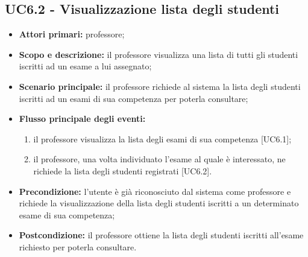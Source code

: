 \documentclass[AnalisiDeiRequisiti.tex]{subfiles}
\begin{document}
\subsection{UC6.2 - Visualizzazione lista degli studenti}
\begin{itemize}
	\item \textbf{Attori primari:} professore;\\
	\item \textbf{Scopo e descrizione:} il professore visualizza una lista di tutti gli studenti iscritti ad un esame a lui assegnato;\\
	\item \textbf{Scenario principale:} il professore richiede al sistema la lista degli studenti iscritti ad un esami di sua competenza per poterla consultare;\\
	\item \textbf{Flusso principale degli eventi:}\\
	\begin{enumerate}
		\item il professore visualizza la lista degli esami di sua competenza [UC6.1];
		\item il professore, una volta individuato l'esame al quale è interessato, ne richiede la lista degli studenti registrati [UC6.2].
	\end{enumerate}
	\item \textbf{Precondizione:} l'utente è già riconosciuto dal sistema come professore e richiede la visualizzazione della lista degli studenti iscritti a un determinato esame di sua competenza;\\
	\item \textbf{Postcondizione:} il professore ottiene la lista degli studenti iscritti all'esame richiesto per poterla consultare.\\
\end{itemize}
\end{document}
